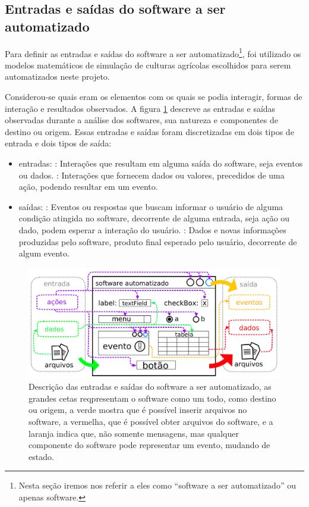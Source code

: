 \documentclass[tg]{mdtufsm}
\begin{document}
            \subsection{Entradas e saídas do software a ser automatizado}

                Para definir as entradas e saídas do software a ser automatizado\footnote{Nesta seção iremos nos referir a eles como “software a ser automatizado” ou apenas software.}, foi utilizado os modelos matemáticos de simulação de culturas agrícolas escolhidos para serem automatizados neste projeto.

                Considerou-se quais eram os elementos com os quais se podia interagir, formas de interação e resultados observados. A figura \ref{fig:modelIO} descreve as entradas e saídas observadas durante a análise dos softwares, sua natureza e componentes de destino ou origem. Essas entradas e saídas foram discretizadas em dois tipos de entrada e dois tipos de saída:

                \begin{itemize}
                    \item entradas:
                        : Interações que resultam em alguma saída do software, seja eventos ou dados.
                        : Interações que fornecem dados ou valores, precedidos de uma ação, podendo resultar em um evento.
                    \item saídas:
                        : Eventos ou respostas que buscam informar o usuário de alguma condição atingida no software, decorrente de alguma entrada, seja ação ou dado, podem esperar a interação do usuário.
                        : Dados e novas informações produzidas pelo software, produto final esperado pelo usuário, decorrente de algum evento.
                \end{itemize}

                \begin{figure}[!htb]
                    {\centering
                    \includegraphics[width=1.0\textwidth]{imagens/modelIO}
                    \caption{Descrição das entradas e saídas do software a ser automatizado, as grandes cetas reqpresentam o software como um todo, como destino ou origem, a verde mostra que é possível inserir arquivos no software, a vermelha, que é possível obter arquivos do software, e a laranja indica que, não somente mensagens, mas qualquer componente do software pode representar um evento, mudando de estado.}
                    \label{fig:modelIO}}
                \end{figure}
\end{document}
